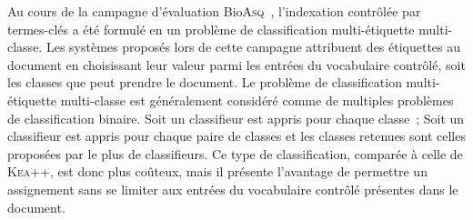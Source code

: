     Au cours de la campagne d'évaluation
    Bio\textsc{Asq}~\cite{partalas2013bioasq}, l'indexation contrôlée par
    termes-clés a été formulé en un problème de classification multi-étiquette
    multi-classe. Les systèmes proposés lors de cette campagne attribuent des
    étiquettes au document en choisissant leur valeur parmi les entrées du
    vocabulaire contrôlé, soit les classes que peut prendre le document. Le
    problème de classification multi-étiquette multi-classe est généralement
    considéré comme de multiples problèmes de classification binaire. Soit un
    classifieur est appris pour chaque classe~; Soit un classifieur est appris
    pour chaque paire de classes et les classes retenues sont celles proposées
    par le plus de classifieurs. Ce type de classification, comparée à celle de
    \textsc{Kea}++, est donc plus coûteux, mais il présente l'avantage de
    permettre un assignement sans se limiter aux entrées du vocabulaire contrôlé
    présentes dans le document.


